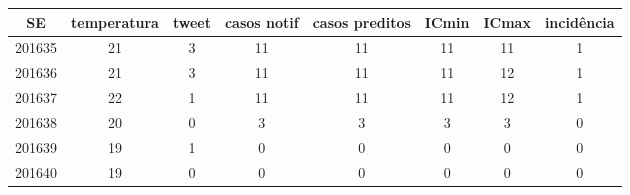 \begin{tabular}{c|ccccccc}
  \hline
SE & temperatura & tweet & casos notif & casos preditos & ICmin & ICmax & incidência \\ 
  \hline
201635 & 21 & 3 & 11 & 11 & 11 & 11 & 1 \\ 
  201636 & 21 & 3 & 11 & 11 & 11 & 12 & 1 \\ 
  201637 & 22 & 1 & 11 & 11 & 11 & 12 & 1 \\ 
  201638 & 20 & 0 & 3 & 3 & 3 & 3 & 0 \\ 
  201639 & 19 & 1 & 0 & 0 & 0 & 0 & 0 \\ 
  201640 & 19 & 0 & 0 & 0 & 0 & 0 & 0 \\ 
   \hline
\end{tabular}
